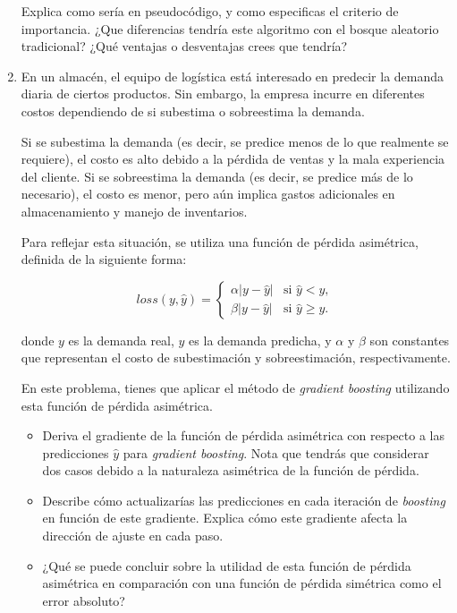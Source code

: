 \documentclass[11pt]{article}
\begin{document}
\begin{enumerate}
Explica como sería en pseudocódigo, y como especificas el criterio de importancia. ¿Que diferencias tendría este algoritmo con el bosque aleatorio tradicional? ¿Qué ventajas o desventajas crees que tendría?

\item En un almacén, el equipo de logística está interesado en predecir la demanda diaria 
de ciertos productos. Sin embargo, la empresa incurre en diferentes costos dependiendo 
de si subestima o sobreestima la demanda.

Si se subestima la demanda (es decir, se predice menos de lo que realmente se requiere), 
el costo es alto debido a la pérdida de ventas y la mala experiencia del cliente.
Si se sobreestima la demanda (es decir, se predice más de lo necesario), el costo es menor, 
pero aún implica gastos adicionales en almacenamiento y manejo de inventarios.

Para reflejar esta situación, se utiliza una función de pérdida asimétrica, 
definida de la siguiente forma:

$$
loss(y, \hat{y}) = \begin{cases}
    \alpha |y - \hat{y}| & \text{si } \hat{y} < y, \\
    \beta  |y - \hat{y}| & \text{si } \hat{y} \ge y.
\end{cases}
$$

donde $y$ es la demanda real, $\hat{y}$ es la demanda predicha, y $\alpha$ y $\beta$ son 
constantes que representan el costo de subestimación y sobreestimación, respectivamente.

En este problema, tienes que aplicar el método de \emph{gradient boosting} utilizando esta función de pérdida asimétrica.

\begin{itemize}
    \item Deriva el gradiente de la función de pérdida asimétrica con respecto a las predicciones $\hat{y}$ 
    para \emph{gradient boosting}. Nota que tendrás que considerar dos casos debido a la naturaleza asimétrica de la función de pérdida.
    \item Describe cómo actualizarías las predicciones en cada iteración de \emph{boosting} en función de este gradiente. Explica cómo este gradiente afecta la dirección de ajuste en cada paso.
    \item ¿Qué se puede concluir sobre la utilidad de esta función de pérdida asimétrica 
    en comparación con una función de pérdida simétrica como el error absoluto?
\end{itemize}

\end{enumerate}
\end{document}
